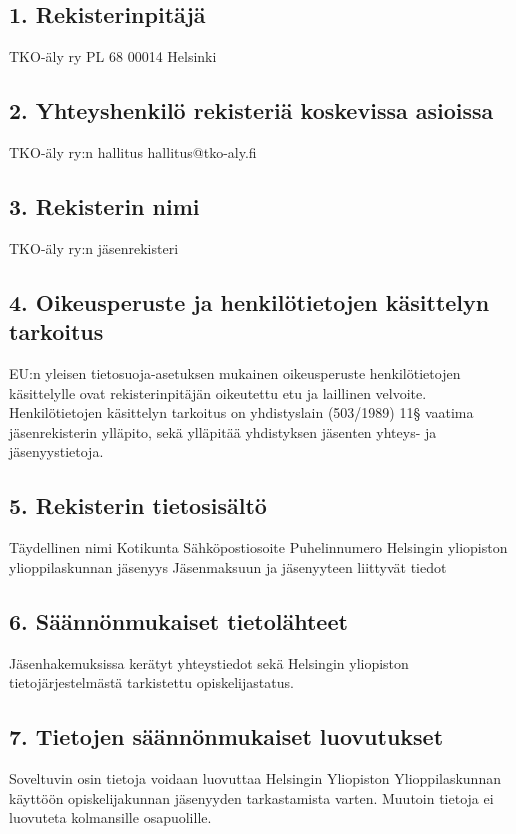 \documentclass[finnish]{tktltiki}
\begin{document}
\subsection*{1. Rekisterinpitäjä}

TKO-äly ry
PL 68
00014 Helsinki
\subsection*{2. Yhteyshenkilö rekisteriä koskevissa asioissa}

TKO-äly ry:n hallitus
hallitus@tko-aly.fi
\subsection*{3. Rekisterin nimi}

TKO-äly ry:n jäsenrekisteri
\subsection*{4. Oikeusperuste ja henkilötietojen käsittelyn tarkoitus}

EU:n yleisen tietosuoja-asetuksen mukainen oikeusperuste henkilötietojen käsittelylle ovat
rekisterinpitäjän oikeutettu etu ja laillinen velvoite.
Henkilötietojen käsittelyn tarkoitus on yhdistyslain (503/1989) 11§ vaatima jäsenrekisterin
ylläpito, sekä ylläpitää yhdistyksen jäsenten yhteys- ja jäsenyystietoja.

\subsection*{5. Rekisterin tietosisältö}
Täydellinen nimi
Kotikunta
Sähköpostiosoite
Puhelinnumero
Helsingin yliopiston ylioppilaskunnan jäsenyys
Jäsenmaksuun ja jäsenyyteen liittyvät tiedot

\subsection*{6. Säännönmukaiset tietolähteet}
Jäsenhakemuksissa kerätyt yhteystiedot sekä Helsingin yliopiston tietojärjestelmästä tarkistettu opiskelijastatus.

\subsection*{7. Tietojen säännönmukaiset luovutukset}

Soveltuvin osin tietoja voidaan luovuttaa Helsingin Yliopiston Ylioppilaskunnan käyttöön opiskelijakunnan jäsenyyden tarkastamista varten. Muutoin tietoja ei luovuteta kolmansille osapuolille.
\end{document}
